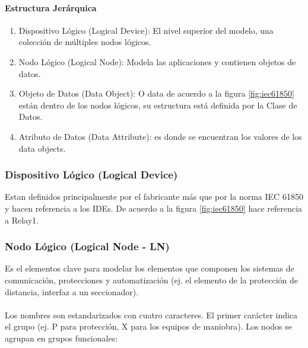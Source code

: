 \documentclass[a5paper]{book}%
\begin{document}
\paragraph{Estructura Jerárquica}

\begin{enumerate}
\item     Dispositivo Lógico (Logical Device): El nivel superior del modelo, una colección de múltiples nodos lógicos.
    
\item Nodo Lógico (Logical Node): Modela las  aplicaciones y contienen objetos de datos.
    
\item Objeto de Datos (Data Object): O data de acuerdo a la figura \ref{fig:iec61850} están dentro de los nodos lógicos, su estructura está definida por la Clase de Datos.
    
\item Atributo de Datos (Data Attribute): es donde se encuentran los valores de los data objects.
  \end{enumerate}

\subsubsection{ Dispositivo Lógico (Logical Device)}

Estan definidos principalmente por el fabricante más que por la norma IEC 61850 y hacen referencia a los IDEs. De acuerdo a la figura \ref{fig:iec61850} hace referencia a Relay1.

\subsubsection{Nodo Lógico (Logical Node - LN)}

Es el elementos clave para modelar los elementos que componen los sistemas de comunicación, protecciones y automatización (ej. el elemento de la protección de distancia, interfaz a un seccionador).\\\\

Los nombres son estandarizados con cuatro caracteres. El primer carácter indica el grupo  (ej. P para protección, X para los equipos de maniobra). Los nodos se agrupan en grupos funcionales:
\end{document}
